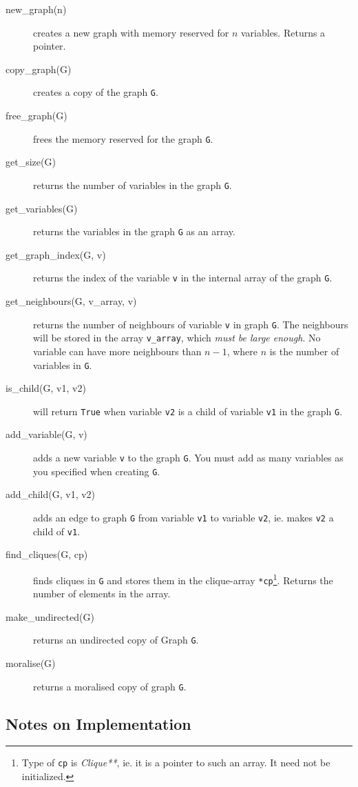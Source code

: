 \documentclass[12pt,a4paper]{report}
\newcommand{\cdatatype}[1]{{\it #1}}
\newcommand{\examplecode}[1]{\texttt{#1}}
\begin{document}
\begin{description}
\item[new\_graph(n)] creates a new graph with memory reserved for $n$
variables. Returns a pointer.
\item[copy\_graph(G)] creates a copy of the graph \examplecode{G}.
\item[free\_graph(G)] frees the memory reserved for the graph
\examplecode{G}.
\item[get\_size(G)] returns the number of variables in the graph
\examplecode{G}.
\item[get\_variables(G)] returns the variables in the graph
\examplecode{G} as an array.
\item[get\_graph\_index(G, v)] returns the index of the variable
\examplecode{v} in the internal array of the graph \examplecode{G}.
\item[get\_neighbours(G, v\_array, v)] returns the number of
neighbours of variable \examplecode{v} in graph \examplecode{G}. The
neighbours will be stored in the array \examplecode{v\_array}, which
{\it must be large enough}. No variable can have more neighbours than
$n-1$, where $n$ is the number of variables in \examplecode{G}.
\item[is\_child(G, v1, v2)] will return \examplecode{True} when
variable \examplecode{v2} is a child of variable \examplecode{v1} in
the graph \examplecode{G}.
\item[add\_variable(G, v)] adds a new variable \examplecode{v} to the
graph \examplecode{G}. You must add as many variables as you specified
when creating \examplecode{G}.
\item[add\_child(G, v1, v2)] adds an edge to graph \examplecode{G}
from variable \examplecode{v1} to variable \examplecode{v2}, ie. makes
\examplecode{v2} a child of \examplecode{v1}.
\item[find\_cliques(G, cp)] finds cliques in \examplecode{G} and
stores them in the clique-array \examplecode{*cp}\footnote{Type of
\examplecode{cp} is \cdatatype{Clique**}, ie. it is a pointer to such
an array. It need not be initialized.}. Returns the number of elements
in the array.
\item[make\_undirected(G)] returns an undirected copy of Graph
\examplecode{G}.
\item[moralise(G)] returns a moralised copy of graph \examplecode{G}.

\end{description}

\subsection{Notes on Implementation}
\end{document}
